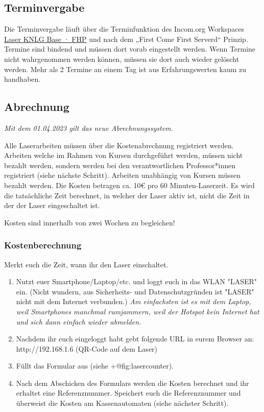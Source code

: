 \documentclass[]{article}
\providecommand{\tightlist}{%
  \setlength{\itemsep}{0pt}\setlength{\parskip}{0pt}}
\begin{document}
\hypertarget{terminvergabe}{%
\subsection{Terminvergabe}\label{terminvergabe}}

Die Terminvergabe läuft über die Terminfunktion des Incom.org Workspaces
\href{https://fhp.incom.community/workspace/6508}{Laser KNLG Base · FHP}
und nach dem „First Come First Serverd`` Prinzip. Termine sind bindend
und müssen dort vorab eingestellt werden. Wenn Termine nicht
wahrgenommen werden können, müssen sie dort auch wieder gelöscht werden.
Mehr als 2 Termine an einem Tag ist aus Erfahrungswerten kaum zu
handhaben.

\hypertarget{abrechnung}{%
\subsection{Abrechnung}\label{abrechnung}}

\emph{Mit dem 01.04.2023 gilt das neue Abrechnungssystem.}

Alle Laserarbeiten müssen über die Kostenabrechnung registriert werden.
Arbeiten welche im Rahmen von Kursen durchgeführt werden, müssen nicht
bezahlt werden, sondern werden bei den verantwortlichen Professor*innen
registriert (siehe nächste Schritt). Arbeiten unabhängig von Kursen
müssen bezahlt werden. Die Kosten betragen ca. 10€ pro 60
Minuten-Laserzeit. Es wird die tatsächliche Zeit berechnet, in welcher
der Laser aktiv ist, nicht die Zeit in der der Laser eingeschaltet ist.

Kosten sind innerhalb von zwei Wochen zu begleichen!

\hypertarget{kostenberechnung}{%
\subsubsection{Kostenberechnung}\label{kostenberechnung}}

Merkt euch die Zeit, wann ihr den Laser einschaltet.

\begin{enumerate}
\def\labelenumi{\arabic{enumi}.}
\tightlist
\item
  Nutzt euer Smartphone/Laptop/etc. und loggt euch in das WLAN "LASER"
  ein. (Nicht wundern, aus Sicherheits- und Datenschutzgründen ist
  "LASER" nicht mit dem Internet verbunden.) \emph{Am einfachsten ist es
  mit dem Laptop, weil Smartphones manchmal rumjammern, weil der Hotspot
  kein Internet hat und sich dann einfach wieder abmelden.}
\item
  Nachdem ihr euch eingeloggt habt gebt folgende URL in eurem Browser
  an: http://192.168.1.6 (QR-Code auf dem Laser)
\item
  Füllt das Formular aus (siehe +@fig:lasercounter).
\item
  Nach dem Abschicken des Formulars werden die Kosten berechnet und ihr
  erhaltet eine Referenznummer. Speichert euch die Referenznummer und
  überweist die Kosten am Kassenautomaten (siehe nächster Schritt).
\end{enumerate}
\end{document}
